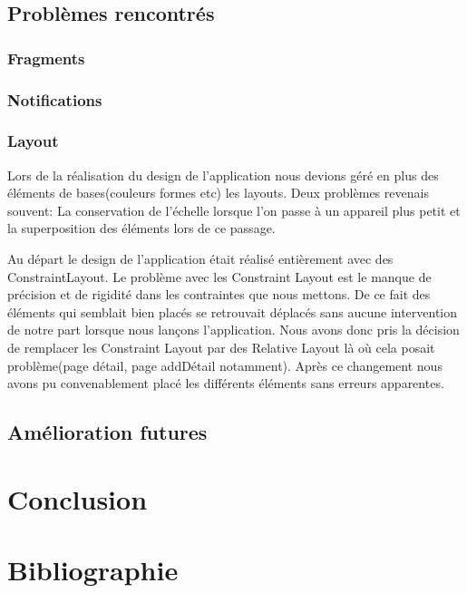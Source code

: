 \documentclass[12pt,a4paper]{report}
\begin{document}
\section{Problèmes rencontrés}
\subsection{Fragments}
\subsection{Notifications}
\subsection{Layout}
\begin{flushleft}
Lors de la réalisation du design de l'application nous devions géré en plus des éléments de bases(couleurs formes etc) les layouts. Deux problèmes revenais souvent: La conservation de l'échelle lorsque l'on passe à un appareil plus petit et la superposition des éléments lors de ce passage.

Au départ le design de l'application était réalisé entièrement avec des ConstraintLayout. Le problème avec les Constraint Layout est le manque de précision et de rigidité dans les contraintes que nous mettons. De ce fait des éléments qui semblait bien placés se retrouvait déplacés sans aucune intervention de notre part lorsque nous lançons l'application. Nous avons donc pris la décision de remplacer les Constraint Layout par des Relative Layout là où cela posait problème(page détail, page addDétail notamment). Après ce changement nous avons pu convenablement placé les différents éléments sans erreurs apparentes.
\end{flushleft}
\section{Amélioration futures}
\newpage
\chapter{Conclusion}
\newpage
\chapter{Bibliographie}
\end{document}
